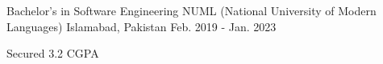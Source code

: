 

\begin{cventries}

  \cventry
    {Bachelor's in Software Engineering} %
    {NUML (National University of Modern Languages)} %
    {Islamabad, Pakistan} %
    {Feb. 2019 - Jan. 2023} %
    {
      \begin{cvitems} %
        \item {Secured 3.2 CGPA}
      \end{cvitems}
    }

\end{cventries}
